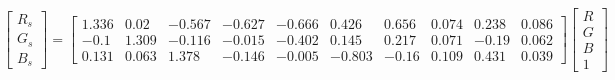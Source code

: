 \begin{equation}
\begin{bmatrix}
  R_s \\ G_s \\ B_s 
\end{bmatrix}=
\left[\begin{matrix}1.336 & 0.02 & -0.567 & -0.627 & -0.666 & 0.426 & 0.656 & 0.074 & 0.238 & 0.086\\ 
-0.1 & 1.309 & -0.116 & -0.015 & -0.402 & 0.145 & 0.217 & 0.071 & -0.19 & 0.062\\ 
0.131 & 0.063 & 1.378 & -0.146 & -0.005 & -0.803 & -0.16 & 0.109 & 0.431 & 0.039\end{matrix}\right]
\begin{bmatrix}
  R \\ G \\ B \\ 1 
\end{bmatrix}
\end{equation}
